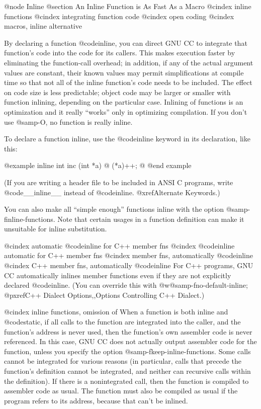 {@node Inline
@section An Inline Function is As Fast As a Macro
@cindex inline functions
@cindex integrating function code
@cindex open coding
@cindex macros, inline alternative

By declaring a function @code{inline}, you can direct GNU CC to
integrate that function's code into the code for its callers.  This
makes execution faster by eliminating the function-call overhead; in
addition, if any of the actual argument values are constant, their known
values may permit simplifications at compile time so that not all of the
inline function's code needs to be included.  The effect on code size is
less predictable; object code may be larger or smaller with function
inlining, depending on the particular case.  Inlining of functions is an
optimization and it really ``works'' only in optimizing compilation.  If
you don't use @samp{-O}, no function is really inline.

To declare a function inline, use the @code{inline} keyword in its
declaration, like this:

@example
inline int
inc (int *a)
@{
  (*a)++;
@}
@end example

(If you are writing a header file to be included in ANSI C programs, write
@code{__inline__} instead of @code{inline}.  @xref{Alternate Keywords}.)

You can also make all ``simple enough'' functions inline with the option
@samp{-finline-functions}.  Note that certain usages in a function
definition can make it unsuitable for inline substitution.

@cindex automatic @code{inline} for C++ member fns
@cindex @code{inline} automatic for C++ member fns
@cindex member fns, automatically @code{inline}
@cindex C++ member fns, automatically @code{inline}
For C++ programs, GNU CC automatically inlines member functions even if
they are not explicitly declared @code{inline}.
(You can override this with @w{@samp{-fno-default-inline}};
@pxref{C++ Dialect Options,,Options Controlling C++ Dialect}.)

@cindex inline functions, omission of
When a function is both inline and @code{static}, if all calls to the
function are integrated into the caller, and the function's address is
never used, then the function's own assembler code is never referenced.
In this case, GNU CC does not actually output assembler code for the
function, unless you specify the option @samp{-fkeep-inline-functions}.
Some calls cannot be integrated for various reasons (in particular,
calls that precede the function's definition cannot be integrated, and
neither can recursive calls within the definition).  If there is a
nonintegrated call, then the function is compiled to assembler code as
usual.  The function must also be compiled as usual if the program
refers to its address, because that can't be inlined.

}
